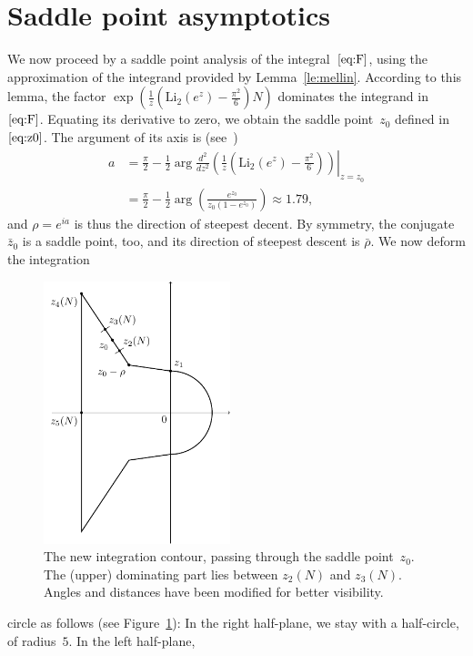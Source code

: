 \documentclass[a4paper]{amsart}
\begin{document}
\section{Saddle point asymptotics}\label{se:saddle}

We now proceed by a saddle point analysis of the integral~$\ref{eq:F}$,
using the approximation of the integrand provided by Lemma~\ref{le:mellin}.
According to this lemma, the factor
$ \exp\left(  \frac1z
  \left( \mathrm{Li}_2(e^z) - \frac{\pi^2}{6}\right) N \right)$
dominates the integrand in~$\ref{eq:F}$. Equating its derivative to zero,
we obtain the saddle point~$z_0$ defined in~$\ref{eq:z0}$. The argument
of its axis is (see~\cite{deBr58})
\begin{align*}
   a &= \frac{ \pi}{2} - \frac12 \arg \frac{d^2}{dz^2} \left.\left(
    \frac1z  \left( \mathrm{Li}_2(e^z) - \frac{\pi^2}{6}\right)\right)
    \right|_{z=z_0} \\
   &=  \frac{ \pi}{2} - \frac12 \arg\left( \frac{e^{z_0}}{z_0(1-e^{z_0})} \right) \approx 1.79,
\end{align*}
and $\rho=e^{ia}$ is thus the direction of steepest decent. By symmetry, the conjugate
$\bar{z}_0$ is a saddle point, too, and its direction of steepest descent is $\bar{\rho}$.
We now deform the integration
%
\begin{figure}
\begin{center}
\includegraphics[height=3in]{contour}
\end{center}
\caption{\label{fig:path} The new integration contour, passing through
the saddle point~$z_0$. The (upper) dominating part lies between
$z_2(N)$ and $z_3(N)$. Angles and distances have been modified
for better visibility.}
\end{figure}
%
circle as follows (see Figure~\ref{fig:path}):
In the right half-plane, we stay with a half-circle, of radius~$5$. In the left half-plane,
\end{document}
